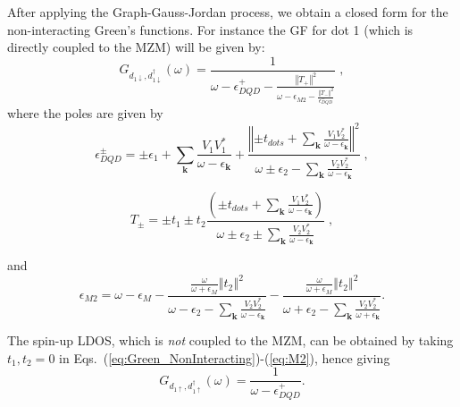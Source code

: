 \documentclass[showpacs,aps,prb,reprint,superscriptaddress]{revtex4-1}
\begin{document}


After applying the Graph-Gauss-Jordan process, we obtain a closed form for the non-interacting Green's functions. For instance the GF for dot 1 (which is directly coupled to the MZM) will be given by:
%
\begin{equation}
G_{{d_{1\downarrow},d_{1\downarrow}^{\dagger}}}\left(\omega\right)=\frac{1}{\omega-\epsilon_{DQD}^{+}-\frac{\left\Vert T_{+}\right\Vert ^{2}}{\omega-\epsilon_{M2}-\frac{\left\Vert T_{-}\right\Vert ^{2}}{\epsilon_{DQD}^{-}}}} \; ,
    \label{eq:Green_NonInteracting}
\end{equation}
%
\noindent where the poles are given by
%
\begin{equation}
%
\epsilon_{DQD}^{\pm}=\pm\epsilon_{1}+\sum_{\mathbf{k}}\frac{V_{1}V_{1}^{*}}{\omega-\epsilon_{\mathbf{k}}}+\frac{\left\Vert \pm t_{dots}+\sum_{\mathbf{k}}\frac{V_{1}V_{2}^{*}}{\omega-\epsilon_{\mathbf{k}}}\right\Vert ^{2}}{\omega\pm\epsilon_{2}-\sum_{\mathbf{k}}\frac{V_{2}V_{2}^{*}}{\omega-\epsilon_{\mathbf{k}}}} \; , \label{eq:epDQD}
\end{equation}
\noindent 

\begin{equation}
    T_{\pm}=\pm t_{1}\pm t_{2}\frac{\left(\pm t_{dots}+\sum_{\mathbf{k}}\frac{V_{1}V_{2}^{*}}{\omega-\epsilon_{\mathbf{k}}}\right)}{\omega\pm\epsilon_{2}\pm\sum_{\mathbf{k}}\frac{V_{2}V_{2}^{*}}{\omega-\epsilon_{\mathbf{k}}}} \; , \label{eq:T+-}
\end{equation}

\noindent and
\begin{equation}
    \epsilon_{M2}=\omega-\epsilon_{M}-\frac{\frac{\omega}{\omega+\epsilon_{M}}\left\Vert t_{2}\right\Vert ^{2} } {\omega-\epsilon_{2}-\sum_{\mathbf{k}}\frac{V_{2}V_{2}^{*}}{\omega-\epsilon_{\mathbf{k}}}}-\frac{\frac{\omega}{\omega+\epsilon_{M}}\left\Vert t_{2}\right\Vert ^{2}}{\omega+\epsilon_{2}-\sum_{\mathbf{k}}\frac{V_{2}V_{2}^{*}}{\omega+\epsilon_{\mathbf{k}}}}. \label{eq:M2}
\end{equation}



\noindent The spin-up LDOS, which is \textit{not} coupled to the MZM, can be obtained by taking $t_1,t_2 = 0$ in Eqs.\ (\ref{eq:Green_NonInteracting})-(\ref{eq:M2}), hence giving
\begin{equation}
    G_{{d_{1\uparrow},d_{1\uparrow}^{\dagger}}}\left(\omega\right)=\frac{1}{\omega-\epsilon_{DQD}^{+}}.
    \label{eq:Green_NonInteracting}
\end{equation}
\end{document}
